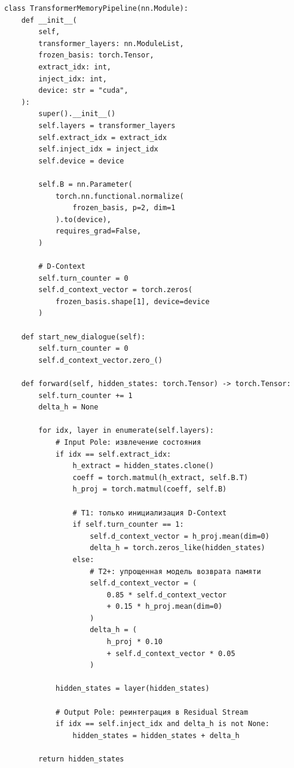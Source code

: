 \documentclass[11pt,a4paper]{article}
\begin{document}
\begin{lstlisting}
class TransformerMemoryPipeline(nn.Module):
    def __init__(
        self,
        transformer_layers: nn.ModuleList,
        frozen_basis: torch.Tensor,
        extract_idx: int,
        inject_idx: int,
        device: str = "cuda",
    ):
        super().__init__()
        self.layers = transformer_layers
        self.extract_idx = extract_idx
        self.inject_idx = inject_idx
        self.device = device

        self.B = nn.Parameter(
            torch.nn.functional.normalize(
                frozen_basis, p=2, dim=1
            ).to(device),
            requires_grad=False,
        )

        # D-Context
        self.turn_counter = 0
        self.d_context_vector = torch.zeros(
            frozen_basis.shape[1], device=device
        )

    def start_new_dialogue(self):
        self.turn_counter = 0
        self.d_context_vector.zero_()

    def forward(self, hidden_states: torch.Tensor) -> torch.Tensor:
        self.turn_counter += 1
        delta_h = None

        for idx, layer in enumerate(self.layers):
            # Input Pole: извлечение состояния
            if idx == self.extract_idx:
                h_extract = hidden_states.clone()
                coeff = torch.matmul(h_extract, self.B.T)
                h_proj = torch.matmul(coeff, self.B)

                # T1: только инициализация D-Context
                if self.turn_counter == 1:
                    self.d_context_vector = h_proj.mean(dim=0)
                    delta_h = torch.zeros_like(hidden_states)
                else:
                    # T2+: упрощенная модель возврата памяти
                    self.d_context_vector = (
                        0.85 * self.d_context_vector
                        + 0.15 * h_proj.mean(dim=0)
                    )
                    delta_h = (
                        h_proj * 0.10
                        + self.d_context_vector * 0.05
                    )

            hidden_states = layer(hidden_states)

            # Output Pole: реинтеграция в Residual Stream
            if idx == self.inject_idx and delta_h is not None:
                hidden_states = hidden_states + delta_h

        return hidden_states
\end{lstlisting}
\end{document}
